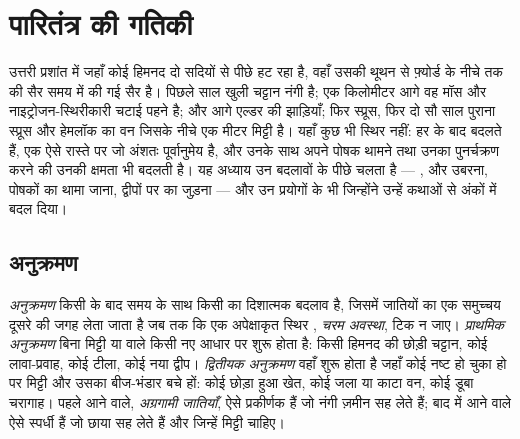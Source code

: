 \chapter{पारितंत्र की गतिकी}\label{ch:b1:ecosystem-dynamics}

उत्तरी प्रशांत में जहाँ कोई हिमनद दो सदियों से पीछे हट रहा है, वहाँ उसकी
थूथन से फ़्योर्ड के नीचे तक की सैर समय में की गई सैर है। पिछले साल खुली
चट्टान नंगी है; एक किलोमीटर आगे वह मॉस और नाइट्रोजन-स्थिरीकारी चटाई पहने
है; और आगे एल्डर की झाड़ियाँ; फिर स्प्रूस, फिर दो सौ साल पुराना स्प्रूस
और हेमलॉक का वन जिसके नीचे एक मीटर मिट्टी है। यहाँ कुछ भी स्थिर नहीं:
 हर  के बाद बदलते हैं, एक ऐसे रास्ते पर जो अंशतः
पूर्वानुमेय है, और उनके साथ अपने पोषक थामने तथा उनका पुनर्चक्रण करने की
उनकी क्षमता भी बदलती है। यह अध्याय उन बदलावों के पीछे चलता है ---
,  और उबरना, पोषकों का थामा जाना, द्वीपों पर  का
जुड़ना --- और उन प्रयोगों के भी जिन्होंने उन्हें कथाओं से अंकों में बदल
दिया।

\section{अनुक्रमण}

\begin{definition}[पारिस्थितिक अनुक्रमण]\label{def:b1:ecosystem-dynamics:succession}
\emph{अनुक्रमण} किसी  के बाद समय के साथ किसी  का दिशात्मक
बदलाव है, जिसमें जातियों का एक समुच्चय दूसरे की जगह लेता जाता है जब तक कि
एक अपेक्षाकृत स्थिर , \emph{चरम अवस्था}, टिक न जाए। \emph{प्राथमिक
अनुक्रमण} बिना मिट्टी या  वाले किसी नए आधार पर शुरू होता है: किसी
हिमनद की छोड़ी चट्टान, कोई लावा-प्रवाह, कोई टीला, कोई नया द्वीप।
\emph{द्वितीयक अनुक्रमण} वहाँ शुरू होता है जहाँ कोई  नष्ट हो चुका
हो पर मिट्टी और उसका बीज-भंडार बचे हों: कोई छोड़ा हुआ खेत, कोई जला या
काटा वन, कोई डूबा चरागाह। पहले आने वाले, \emph{अग्रगामी जातियाँ}, ऐसे
प्रकीर्णक हैं जो नंगी ज़मीन सह लेते हैं; बाद में आने वाले ऐसे स्पर्धी हैं
जो छाया सह लेते हैं और जिन्हें मिट्टी चाहिए।
\end{definition}

